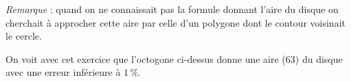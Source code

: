 
\emph{Remarque} : quand on ne connaissait pas la formule donnant l'aire du disque on cherchait à approcher cette aire par celle d'un polygone dont le contour voisinait le cercle.

On voit avec cet exercice que l'octogone ci-dessus donne une aire (63) du disque avec une erreur inférieure à $1\,\%$.
